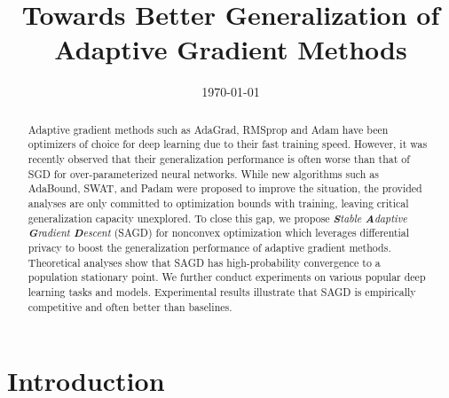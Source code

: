 \documentclass[11pt]{article}
\begin{document}
\title{\vspace{-0.1in}Towards Better Generalization of Adaptive Gradient Methods\vspace{-0.15in}}
\date{\today}

\maketitle


\begin{abstract}\vspace{-0.1in}
Adaptive gradient methods such as AdaGrad, RMSprop and Adam have been optimizers of choice for deep learning due to their fast training speed. However, it was recently observed that their generalization performance is often worse than that of SGD for over-parameterized neural networks. While new algorithms such as AdaBound, SWAT, and Padam were proposed to improve the situation, the provided analyses are only committed to optimization bounds with training, leaving critical generalization capacity unexplored. To close this gap, we propose \textit{\textbf{S}table \textbf{A}daptive \textbf{G}radient \textbf{D}escent} (\textsc{SAGD}) for nonconvex optimization which leverages differential privacy to boost the generalization performance of adaptive gradient methods. Theoretical analyses show that \textsc{SAGD} has high-probability convergence to a population stationary point. We further conduct experiments on various popular deep learning tasks and models. Experimental results illustrate that \textsc{SAGD} is empirically competitive and often better than baselines. 
\end{abstract}

\vspace{-0.15in}
\section{Introduction}
\vspace{-0.05in}
\end{document}
